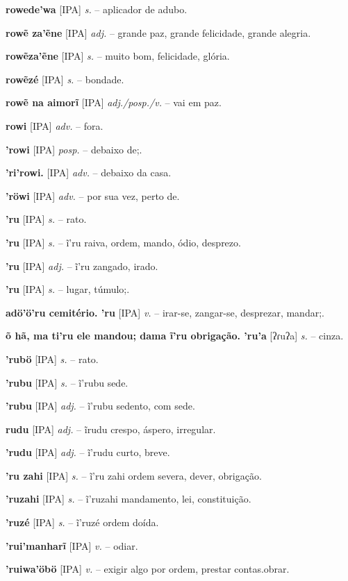 \textbf{rowede'wa} [IPA] \textit{s.} -- aplicador de adubo.

\textbf{rowẽ za'ẽne} [IPA] \textit{adj.} -- grande paz, grande felicidade, grande alegria.

\textbf{rowẽza'ẽne} [IPA] \textit{s.} -- muito bom, felicidade, glória.

\textbf{rowẽzé} [IPA] \textit{s.} -- bondade.

\textbf{rowẽ na aimorĩ} [IPA] \textit{adj./posp./v.} -- vai em paz.

\textbf{rowi} [IPA] \textit{adv.} -- fora.

\textbf{'rowi} [IPA] \textit{posp.} -- debaixo de;.

\textbf{'ri'rowi.} [IPA] \textit{adv.} -- debaixo da casa.

\textbf{'röwi} [IPA] \textit{adv.} -- por sua vez, perto de.

\textbf{'ru} [IPA] \textit{s.} -- rato.

\textbf{'ru} [IPA] \textit{s.} -- ĩ'ru raiva, ordem, mando, ódio, desprezo.

\textbf{'ru} [IPA] \textit{adj.} -- ĩ'ru zangado, irado.

\textbf{'ru} [IPA] \textit{s.} -- lugar, túmulo;.

\textbf{adö'ö'ru cemitério. 'ru} [IPA] \textit{v.} -- irar-se, zangar-se, desprezar, mandar;.

\textbf{õ hã, ma ti'ru ele mandou; dama ĩ'ru obrigação. 'ru'a} [ʔɾuʔa] \textit{s.} -- cinza.

\textbf{'rubö} [IPA] \textit{s.} -- rato.

\textbf{'rubu} [IPA] \textit{s.} -- ĩ'rubu sede.

\textbf{'rubu} [IPA] \textit{adj.} -- ĩ'rubu sedento, com sede.

\textbf{rudu} [IPA] \textit{adj.} -- ĩrudu crespo, áspero, irregular.

\textbf{'rudu} [IPA] \textit{adj.} -- ĩ'rudu curto, breve.

\textbf{'ru zahi} [IPA] \textit{s.} -- ĩ'ru zahi ordem severa, dever, obrigação.

\textbf{'ruzahi} [IPA] \textit{s.} -- ĩ'ruzahi mandamento, lei, constituição.

\textbf{'ruzé} [IPA] \textit{s.} -- ĩ'ruzé ordem doída.

\textbf{'rui'manharĩ} [IPA] \textit{v.} -- odiar.

\textbf{'ruiwa'öbö} [IPA] \textit{v.} -- exigir algo por ordem, prestar contas.obrar.

